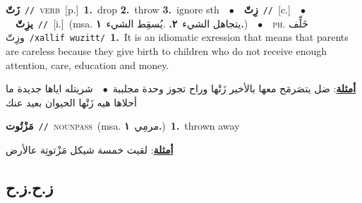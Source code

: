 \documentclass[10pt,a4paper,twoside]{article} %
\begin{document}
\begin{multicols}{2}
{\setlength\topsep{0pt}\textbf{\foreignlanguage{arabic}{زَتّ}}\ {\color{gray}\texttt{//}\color{black}}\ \textsc{verb}\ [p.]\ \textbf{1.}~drop  \textbf{2.}~throw  \textbf{3.}~ignore sth\ \ $\bullet$\ \ \setlength\topsep{0pt}\textbf{\foreignlanguage{arabic}{زِتّ}}\ {\color{gray}\texttt{//}\color{black}}\ [c.]\ \ $\bullet$\ \ \setlength\topsep{0pt}\textbf{\foreignlanguage{arabic}{يزِتّ}}\ {\color{gray}\texttt{//}\color{black}}\ [i.]\ \color{gray}(msa. \foreignlanguage{arabic}{يتجاهل الشيء}~\foreignlanguage{arabic}{\textbf{٢.}}  .\foreignlanguage{arabic}{يُسقِط الشيء}~\foreignlanguage{arabic}{\textbf{١.}})\color{black}\ \ $\bullet$\ \ \textsc{ph.} \color{gray} \foreignlanguage{arabic}{خَلِّف وزِتّ}\color{black}\ {\color{gray}\texttt{/{\sffamily xallif wuzitt}/}\color{black}}\ \textbf{1.}~It is an idiomatic exression that means that parents are careless because they give birth to children who do not receive enough attention, care, education and money.\  \begin{flushright}\color{gray}\foreignlanguage{arabic}{\textbf{\underline{\foreignlanguage{arabic}{أمثلة}}}: ضل يتصَرمَح معها بالأخير زَتْها وراح تجوز وحدة مجلببة\ $\bullet$\ \  شريتله اياها جديدة ما أحلاها هيه زَتْها الحيوان بعيد عنك}\end{flushright}\color{black}} \vspace{2mm}

{\setlength\topsep{0pt}\textbf{\foreignlanguage{arabic}{مَزْتُوت}}\ {\color{gray}\texttt{//}\color{black}}\ \textsc{noun\textunderscore pass}\ \color{gray}(msa. \foreignlanguage{arabic}{مرمِي}~\foreignlanguage{arabic}{\textbf{١.}})\color{black}\ \textbf{1.}~thrown away\  \begin{flushright}\color{gray}\foreignlanguage{arabic}{\textbf{\underline{\foreignlanguage{arabic}{أمثلة}}}: لقيت خمسة شيكل مَزْتوتِة عالأرض}\end{flushright}\color{black}} \vspace{2mm}

\vspace{-3mm}
\subsection*{\color{blue}\foreignlanguage{arabic}{ز.ح.ز.ح}\color{blue}{}} 


\end{multicols}
\end{document}
